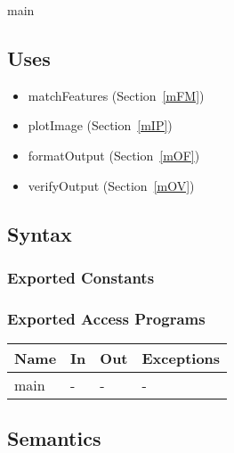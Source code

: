 \documentclass[12pt, titlepage]{article}
\begin{document}
main

\subsection{Uses}
\begin{itemize}
  \item matchFeatures (Section~\ref{mFM})
  \item plotImage (Section~\ref{mIP})
  \item formatOutput (Section~\ref{mOF})
  \item verifyOutput (Section~\ref{mOV})
\end{itemize}

\subsection{Syntax}

\subsubsection{Exported Constants}

\subsubsection{Exported Access Programs}

\begin{center}
\begin{tabular}{p{2cm} p{4cm} p{4cm} p{2cm}}
\hline
\textbf{Name} & \textbf{In} & \textbf{Out} & \textbf{Exceptions} \\
\hline
main & - & - & - \\
\hline
\end{tabular}
\end{center}

\subsection{Semantics}
\end{document}
